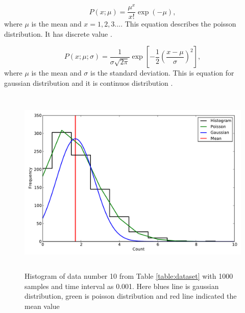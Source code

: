 \documentclass[a4paper,12pt]{article}
\begin{document}
\begin{equation}
\label{eq:poisson}
P(x;\mu) = \frac{\mu^x}{x!}\exp(-\mu),
\end{equation}
where $\mu$ is the mean and $x = 1, 2, 3 ...$. This equation describes the poisson distribution. It has discrete value \citep{Stat}. 

\begin{equation}
\label{eq:gaussian}
P(x;\mu;\sigma) = \frac{1}{\sigma \sqrt{2\pi}}\exp \left[-\frac{1}{2} \left(\frac{x - \mu}{\sigma} \right)^2 \right],
\end{equation}
where $\mu$ is the mean and $\sigma$ is the standard deviation. This is equation for gaussian distribution and it is continuos distribution \citep{Stat}.

\begin{figure}[H]
\centering
\includegraphics[angle=0,height=9cm,width=15.5cm]{graphs/Hist_distribution_small.pdf}
\caption{Histogram of data number 10 from Table \ref{table:dataset} with 1000 samples and time interval as 0.001. Here blues line is gaussian distribution, green is poisson distribution and red line indicated the mean value}
\label{fig:poisson}
\end{figure}
\end{document}
